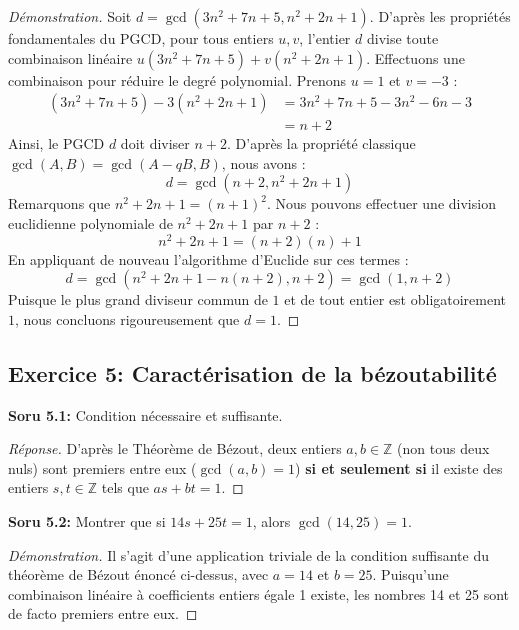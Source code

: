 \documentclass[12pt,a4paper]{report}
\begin{document}
\begin{proof}[Démonstration]
Soit $d = \gcd(3n^2 + 7n + 5, n^2 + 2n + 1)$. D'après les propriétés fondamentales du PGCD, pour tous entiers $u, v$, l'entier $d$ divise toute combinaison linéaire $u(3n^2 + 7n + 5) + v(n^2 + 2n + 1)$.
Effectuons une combinaison pour réduire le degré polynomial. Prenons $u = 1$ et $v = -3$ :
\begin{align*}
(3n^2 + 7n + 5) - 3(n^2 + 2n + 1) &= 3n^2 + 7n + 5 - 3n^2 - 6n - 3 \\
&= n + 2
\end{align*}
Ainsi, le PGCD $d$ doit diviser $n + 2$. D'après la propriété classique $\gcd(A, B) = \gcd(A - qB, B)$, nous avons :
\[ d = \gcd(n + 2, n^2 + 2n + 1) \]
Remarquons que $n^2 + 2n + 1 = (n + 1)^2$. Nous pouvons effectuer une division euclidienne polynomiale de $n^2 + 2n + 1$ par $n + 2$ :
\[ n^2 + 2n + 1 = (n + 2)(n) + 1 \]
En appliquant de nouveau l'algorithme d'Euclide sur ces termes :
\[ d = \gcd(n^2 + 2n + 1 - n(n+2), n+2) = \gcd(1, n+2) \]
Puisque le plus grand diviseur commun de $1$ et de tout entier est obligatoirement $1$, nous concluons rigoureusement que $d = 1$.
\end{proof}

\subsection*{Exercice 5: Caractérisation de la bézoutabilité}
\textbf{Soru 5.1:} Condition nécessaire et suffisante.
\begin{proof}[Réponse]
D'après le Théorème de Bézout, deux entiers $a, b \in \mathbb{Z}$ (non tous deux nuls) sont premiers entre eux ($\gcd(a, b) = 1$) \textbf{si et seulement si} il existe des entiers $s, t \in \mathbb{Z}$ tels que $as + bt = 1$.
\end{proof}

\textbf{Soru 5.2:} Montrer que si $14s + 25t = 1$, alors $\gcd(14, 25) = 1$.
\begin{proof}[Démonstration]
Il s'agit d'une application triviale de la condition suffisante du théorème de Bézout énoncé ci-dessus, avec $a=14$ et $b=25$. Puisqu'une combinaison linéaire à coefficients entiers égale 1 existe, les nombres 14 et 25 sont de facto premiers entre eux.
\end{proof}
\end{document}
